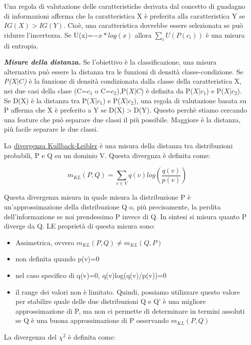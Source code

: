 \documentclass[a4paper]{extarticle}
\begin{document}
Una regola di valutazione delle caratteristiche derivata dal concetto di guadagno di informazioni afferma che la caratteristica X è preferita alla caratteristica Y se $IG(X)>IG(Y)$. Cioè, una caratteristica dovrebbe essere selezionata se può ridurre l'incertezza. Se U(x)=$-x*log(x)$ allora $\sum_{i}U(P(c_i))$ è una misura di entropia.

\textbf{\textit{Misure della distanza.}} Se l'obiettivo è la classificazione, una misura alternativa può essere la distanza tra le funzioni di densità classe-condizione. Se \textit{P($X|C$)} è la funzione di densità condizionata dalla classe della caratteristica X, nei due casi della clase (C=$c_1$ o C=$c_2$),P($X|C$) è definita da P($X|c_1$) e P($X|c_2$). Se D(X) è la distanza tra P($X|c_1$) e P($X|c_2$), una regola di valutazione basata su P afferma che X è preferito a Y se D(X)$>$D(Y). Questo perchè stiamo cercando una feature che può separare due classi il più possibile. Maggiore è la distanza, più facile separare le due classi.

La \underline{divergenza Kullback-Leibler} è una misura della distanza tra distribuzioni probabili, P e Q su un dominio V. Questa divergnza è definita come:

\begin{equation}
m_{KL}(P,Q)= \sum_{v\in V} q(v)log(\dfrac {q(v)}{p(v)})
\end{equation}

Questa divergenza misura in quale misura la distribuzione P è un'approssimazione della distribuzione Q o, più precisamente, la perdita dell'informazione se noi prendessimo P invece di Q. In sintesi si misura quanto P diverge da Q. LE proprietà di questa misura sono:

\begin{itemize}
\item Assimetrica, ovvero $m_{KL}(P,Q) \not = m_{KL}(Q,P)$
\item non definita quando p(v)=0
\item nel caso specifico di q(v)=0, q(v)log(q(v)/p(v))=0
\item il range dei valori non è limitato. Quindi, possiamo utilizzare questo valore per stabilire quale delle due distribuzioni Q e Q' è una migliore approssimazione di P, ma non ci permette di determinare in termini assoluti se Q è una buona approssimazione di P osservando $m_{KL}(P,Q)$
\end{itemize} 

La divergenza del $\chi ^2$ è definita come:
\end{document}
